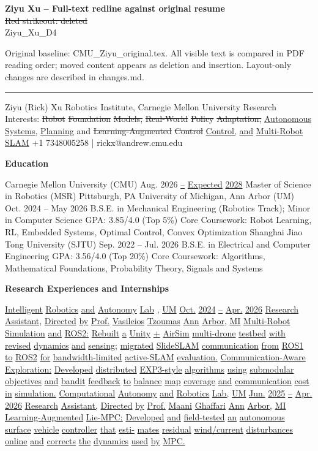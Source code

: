 \documentclass[10pt,letterpaper]{article}
\newcommand{\del}[1]{{\color{red}\sout{#1}}}
\newcommand{\add}[1]{{\color{blue}\uline{#1}}}
\begin{document}
\textbf{Ziyu Xu -- Full-text redline against original resume}\\
\del{Red strikeout: deleted} \quad \add{Blue underline: added}\\
Ziyu\_Xu\_D4\par
Original baseline: CMU\_Ziyu\_original.tex. All visible text is compared in PDF reading order; moved content appears as deletion and insertion. Layout-only changes are described in changes.md.
\hrule\medskip
Ziyu (Rick) Xu Robotics Institute, Carnegie Mellon University Research Interests: \del{Robot} \del{Foundation} \del{Models,} \del{Real-World} \del{Policy} \del{Adaptation,} \add{Autonomous} \add{Systems,} \add{Planning} and \del{Learning-Augmented} \del{Control} \add{Control,} \add{and} \add{Multi-Robot} \add{SLAM} +1 7348005258 | rickx@andrew.cmu.edu \par\medskip\textbf{Education}\par  Carnegie Mellon University (CMU) Aug. 2026 \add{--} \add{Expected} \add{2028} Master of Science in Robotics (MSR) Pittsburgh, PA University of Michigan, Ann Arbor (UM) Oct. 2024 -- May 2026 B.S.E. in Mechanical Engineering (Robotics Track); Minor in Computer Science GPA: 3.85/4.0 (Top 5\%)  Core Coursework: Robot Learning, RL, Embedded Systems, Optimal Control, Convex Optimization Shanghai Jiao Tong University (SJTU) Sep. 2022 -- Jul. 2026 B.S.E. in Electrical and Computer Engineering GPA: 3.56/4.0 (Top 20\%)  Core Coursework: Algorithms, Mathematical Foundations, Probability Theory, Signals and Systems \par\medskip\textbf{Research Experiences and Internships}\par  \add{Intelligent} \add{Robotics} \add{and} \add{Autonomy} \add{Lab} \add{,} \add{UM} \add{Oct.} \add{2024} \add{--} \add{Apr.} \add{2026} \add{Research} \add{Assistant,} \add{Directed} \add{by} \add{Prof.} \add{Vasileios} \add{Tzoumas} \add{Ann} \add{Arbor,} \add{MI} \add{} \add{Multi-Robot} \add{Simulation} \add{and} \add{ROS2:} \add{Rebuilt} \add{a} \add{Unity} \add{+} \add{AirSim} \add{multi-drone} \add{testbed} \add{with} \add{revised} \add{dynamics} \add{and} \add{sensing;} \add{migrated} \add{SlideSLAM} \add{communication} \add{from} \add{ROS1} \add{to} \add{ROS2} \add{for} \add{bandwidth-limited} \add{active-SLAM} \add{evaluation.} \add{} \add{Communication-Aware} \add{Exploration:} \add{Developed} \add{distributed} \add{EXP3-style} \add{algorithms} \add{using} \add{submodular} \add{objectives} \add{and} \add{bandit} \add{feedback} \add{to} \add{balance} \add{map} \add{coverage} \add{and} \add{communication} \add{cost} \add{in} \add{simulation.} \add{Computational} \add{Autonomy} \add{and} \add{Robotics} \add{Lab,} \add{UM} \add{Jun.} \add{2025} \add{--} \add{Apr.} \add{2026} \add{Research} \add{Assistant,} \add{Directed} \add{by} \add{Prof.} \add{Maani} \add{Ghaffari} \add{Ann} \add{Arbor,} \add{MI} \add{} \add{Learning-Augmented} \add{Lie-MPC:} \add{Developed} \add{and} \add{field-tested} \add{an} \add{autonomous} \add{surface} \add{vehicle} \add{controller} \add{that} \add{esti-} \add{mates} \add{residual} \add{wind/current} \add{disturbances} \add{online} \add{and} \add{corrects} \add{the} \add{dynamics} \add{used} \add{by} \add{MPC.} 
\end{document}
